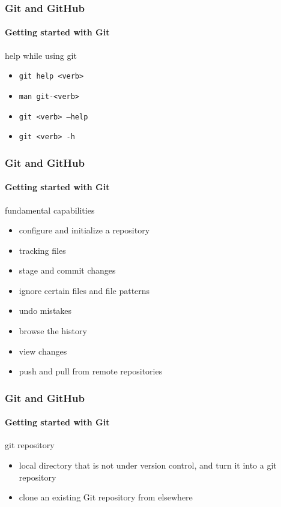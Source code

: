 \begin{frame}
    \frametitle{Git and GitHub}
    \framesubtitle{Getting started with Git}
    \addtocounter{nframe}{1}
	
	\begin{block}{help while using git}
		\begin{itemize}
			\item \texttt{git help <verb>}
			\item \texttt{man git-<verb>}
			\item \texttt{git <verb> --help}
			\item \texttt{git <verb> -h}
		\end{itemize}
    \end{block}

\end{frame}


\begin{frame}
    \frametitle{Git and GitHub}
    \framesubtitle{Getting started with Git}
    \addtocounter{nframe}{1}
	
	\begin{block}{fundamental capabilities}
		\begin{itemize}
			\item configure and initialize a repository
			\item tracking files
			\item stage and commit changes
			\item ignore certain files and file patterns
			\item undo mistakes
			\item browse the history
			\item view changes
			\item push and pull from remote repositories
		\end{itemize}
    \end{block}

\end{frame}

\begin{frame}
    \frametitle{Git and GitHub}
    \framesubtitle{Getting started with Git}
    \addtocounter{nframe}{1}
	
	\begin{block}{git repository}
		\begin{itemize}
			\item local directory that is not under version control, and turn it into a git repository
			\item clone an existing Git repository from elsewhere
		\end{itemize}
    \end{block}

\end{frame}

